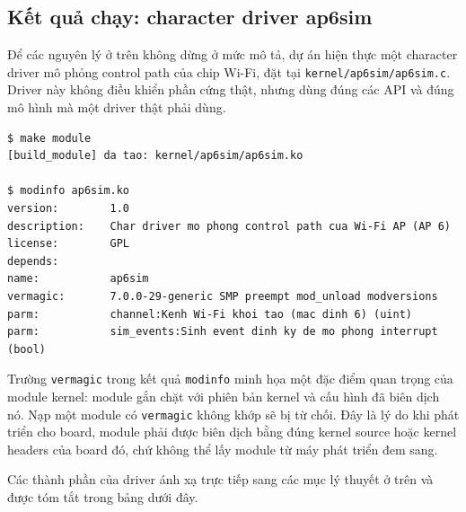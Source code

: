 \documentclass[11pt]{article}
\newcommand{\code}[1]{\texttt{#1}}
\begin{document}
\subsection{Kết quả chạy: character driver ap6sim}

Để các nguyên lý ở trên không dừng ở mức mô tả, dự án hiện thực một character driver mô phỏng control path của chip Wi-Fi, đặt tại \code{kernel/ap6sim/ap6sim.c}. Driver này không điều khiển phần cứng thật, nhưng dùng đúng các API và đúng mô hình mà một driver thật phải dùng.

\begin{lstlisting}[caption={Kết quả biên dịch module trên kernel đang chạy}]
$ make module
[build_module] da tao: kernel/ap6sim/ap6sim.ko

$ modinfo ap6sim.ko
version:        1.0
description:    Char driver mo phong control path cua Wi-Fi AP (AP 6)
license:        GPL
depends:
name:           ap6sim
vermagic:       7.0.0-29-generic SMP preempt mod_unload modversions
parm:           channel:Kenh Wi-Fi khoi tao (mac dinh 6) (uint)
parm:           sim_events:Sinh event dinh ky de mo phong interrupt (bool)
\end{lstlisting}

Trường \code{vermagic} trong kết quả \code{modinfo} minh họa một đặc điểm quan trọng của module kernel: module gắn chặt với phiên bản kernel và cấu hình đã biên dịch nó. Nạp một module có \code{vermagic} không khớp sẽ bị từ chối. Đây là lý do khi phát triển cho board, module phải được biên dịch bằng đúng kernel source hoặc kernel headers của board đó, chứ không thể lấy module từ máy phát triển đem sang.

Các thành phần của driver ánh xạ trực tiếp sang các mục lý thuyết ở trên và được tóm tắt trong bảng dưới đây.
\end{document}
